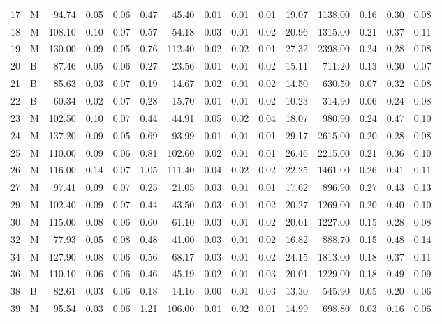 \begin{table}[ht]
\begin{tabular}{rlrrrrrrrrrrrrr}
  17 & M & 94.74 & 0.05 & 0.06 & 0.47 & 45.40 & 0.01 & 0.01 & 0.01 & 19.07 & 1138.00 & 0.16 & 0.30 & 0.08 \\ 
  18 & M & 108.10 & 0.10 & 0.07 & 0.57 & 54.18 & 0.03 & 0.01 & 0.02 & 20.96 & 1315.00 & 0.21 & 0.37 & 0.11 \\ 
  19 & M & 130.00 & 0.09 & 0.05 & 0.76 & 112.40 & 0.02 & 0.02 & 0.01 & 27.32 & 2398.00 & 0.24 & 0.28 & 0.08 \\ 
  20 & B & 87.46 & 0.05 & 0.06 & 0.27 & 23.56 & 0.01 & 0.01 & 0.02 & 15.11 & 711.20 & 0.13 & 0.30 & 0.07 \\ 
  21 & B & 85.63 & 0.03 & 0.07 & 0.19 & 14.67 & 0.02 & 0.01 & 0.02 & 14.50 & 630.50 & 0.07 & 0.32 & 0.08 \\ 
  22 & B & 60.34 & 0.02 & 0.07 & 0.28 & 15.70 & 0.01 & 0.01 & 0.02 & 10.23 & 314.90 & 0.06 & 0.24 & 0.08 \\ 
  23 & M & 102.50 & 0.10 & 0.07 & 0.44 & 44.91 & 0.05 & 0.02 & 0.04 & 18.07 & 980.90 & 0.24 & 0.47 & 0.10 \\ 
  24 & M & 137.20 & 0.09 & 0.05 & 0.69 & 93.99 & 0.01 & 0.01 & 0.01 & 29.17 & 2615.00 & 0.20 & 0.28 & 0.08 \\ 
  25 & M & 110.00 & 0.09 & 0.06 & 0.81 & 102.60 & 0.02 & 0.01 & 0.01 & 26.46 & 2215.00 & 0.21 & 0.36 & 0.10 \\ 
  26 & M & 116.00 & 0.14 & 0.07 & 1.05 & 111.40 & 0.04 & 0.02 & 0.02 & 22.25 & 1461.00 & 0.26 & 0.41 & 0.11 \\ 
  27 & M & 97.41 & 0.09 & 0.07 & 0.25 & 21.05 & 0.03 & 0.01 & 0.01 & 17.62 & 896.90 & 0.27 & 0.43 & 0.13 \\ 
  29 & M & 102.40 & 0.09 & 0.07 & 0.44 & 43.50 & 0.03 & 0.01 & 0.02 & 20.27 & 1269.00 & 0.20 & 0.40 & 0.10 \\ 
  30 & M & 115.00 & 0.08 & 0.06 & 0.60 & 61.10 & 0.03 & 0.01 & 0.02 & 20.01 & 1227.00 & 0.15 & 0.28 & 0.08 \\ 
  32 & M & 77.93 & 0.05 & 0.08 & 0.48 & 41.00 & 0.03 & 0.01 & 0.02 & 16.82 & 888.70 & 0.15 & 0.48 & 0.14 \\ 
  34 & M & 127.90 & 0.08 & 0.06 & 0.56 & 68.17 & 0.03 & 0.01 & 0.02 & 24.15 & 1813.00 & 0.18 & 0.37 & 0.11 \\ 
  36 & M & 110.10 & 0.06 & 0.06 & 0.46 & 45.19 & 0.02 & 0.01 & 0.03 & 20.01 & 1229.00 & 0.18 & 0.49 & 0.09 \\ 
  38 & B & 82.61 & 0.03 & 0.06 & 0.18 & 14.16 & 0.00 & 0.01 & 0.03 & 13.30 & 545.90 & 0.05 & 0.20 & 0.06 \\ 
  39 & M & 95.54 & 0.03 & 0.06 & 1.21 & 106.00 & 0.01 & 0.02 & 0.01 & 14.99 & 698.80 & 0.03 & 0.16 & 0.06 \\ 

\end{tabular}
\end{table}
